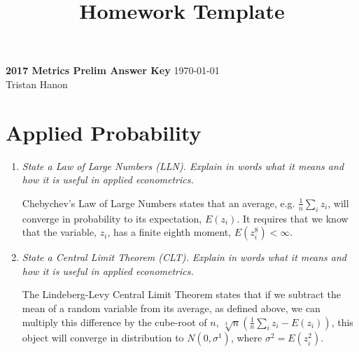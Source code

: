\documentclass[letterpaper, 12pt]{article}
\title{Homework Template}
\begin{document}
\noindent
\large\textbf{2017 Metrics Prelim Answer Key} \hfill \today \\
Tristan Hanon

\section{Applied Probability}

\begin{enumerate}
    \item \textit{State a Law of Large Numbers (LLN). Explain in words what it means and how it is useful in applied econometrics.}
    
    Chebychev's Law of Large Numbers states that an average, e.g. $\frac{1}{n} \sum_i z_i$, will converge in probability to its expectation, $E(z_i)$. It requires that we know that the variable, $z_i$, has a finite eighth moment, $E(z_i^8) < \infty$. 
    
    \item \textit{State a Central Limit Theorem (CLT). Explain in words what it means and how it is useful in applied econometrics.}
    
    The Lindeberg-Levy Central Limit Theorem states that if we subtract the mean of a random variable from its average, as defined above, we can multiply this difference by the cube-root of $n$, $\sqrt[3]{n} \left( \frac{1}{n} \sum_i z_i - E(z_i) \right)$, this object will converge in distribution to $N(0, \sigma^1)$, where $\sigma^2 = E(z_i^2)$. 
\end{enumerate}
\end{document}
